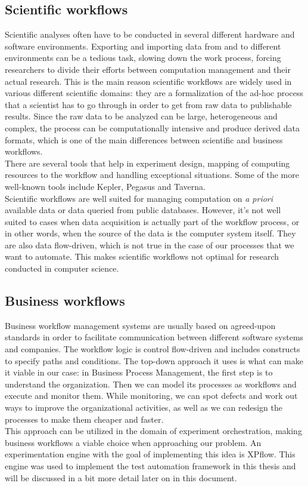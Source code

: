 \subsection{Scientific workflows}
Scientific analyses often have to be conducted in several different
hardware and software environments. Exporting and importing data from
and to different environments can be a tedious task, slowing down the
work process, forcing researchers to divide their efforts between
computation management and their actual research. This is the main
reason scientific workflows are widely used in various different
scientific domains: they are a formalization of the ad-hoc
process that a scientist has to go through in order to get from raw
data to publishable results. Since the raw data to be analyzed can be
large, heterogeneous and complex, the process can be computationally
intensive and produce derived data formats, which is one of the main
differences between scientific and business
workflows.\cite{abjjlm04}\\[0.3cm]
There are several tools that help in experiment design, mapping of
computing resources to the workflow and handling exceptional
situations. Some of the more well-known tools include
Kepler\cite{abjjlm04}, Pegasus\cite{dssbgkmvbgljk05} and
Taverna\cite{whfwwsdnfbbbhnvsg13}.\\[0.3cm]
Scientific workflows are well suited for managing computation on
\emph{a priori} available data or data queried from public
databases. However, it's not well suited to cases when data
acquisition is actually part of the workflow process, or in other
words, when the source of the data is the computer system
itself. They are also data flow-driven, which is not true in the case
of our processes that we want to automate. This makes scientific
workflows not optimal for research conducted in computer science.
\subsection{Business workflows}
Business workflow management systems are usually based on agreed-upon
standards in order to facilitate communication between different
software systems and companies. The workflow logic is control
flow-driven and includes constructs to specify paths and
conditions.\cite{skd10} The top-down approach it uses is what can make
it viable in our case: in Business Process Management, the first step
is to understand the organization. Then we can model its processes as
workflows and execute and monitor them. While monitoring,
we can spot defects and work out ways to improve the organizational
activities, as well as we can redesign the processes to make them
cheaper and faster.\cite{bn12_2}\\[0.3cm]
This approach can be utilized in the domain of experiment
orchestration, making business workflows a viable choice when
approaching our problem. An experimentation engine with the goal of
implementing this idea is XPflow\cite{bn12_2}. This engine was used to
implement the test automation framework in this thesis and will be
discussed in a bit more detail later on in this document.
